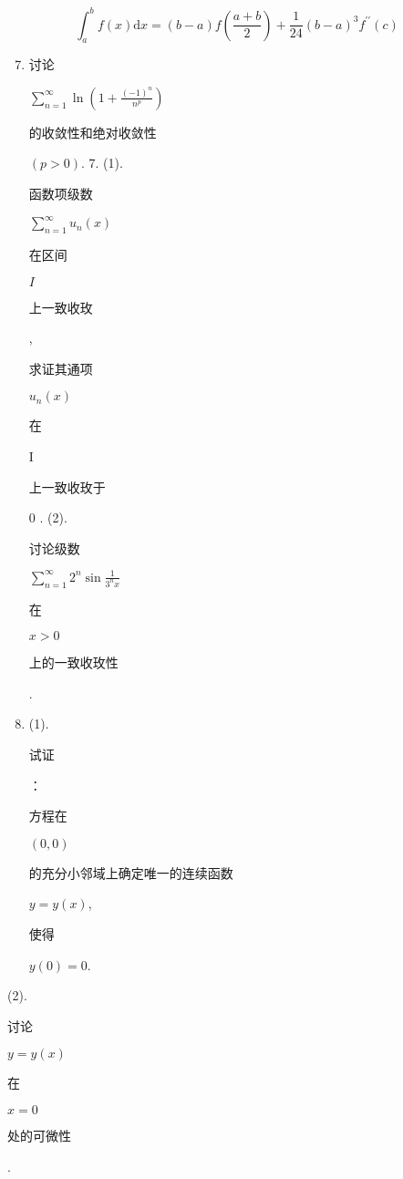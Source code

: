 \documentclass[10pt]{article}
\begin{document}
$$
\int_{a}^{b} f(x) \mathrm{d} x=(b-a) f\left(\frac{a+b}{2}\right)+\frac{1}{24}(b-a)^{3} f^{\prime \prime}(c)
$$

\begin{enumerate}
  \setcounter{enumi}{6}
  \item \begin{CJK}{UTF8}{mj}讨论\end{CJK} $\sum_{n=1}^{\infty} \ln \left(1+\frac{(-1)^{n}}{n^{p}}\right)$ \begin{CJK}{UTF8}{mj}的收敛性和绝对收敛性\end{CJK} $(p>0)$. 7. (1). \begin{CJK}{UTF8}{mj}函数项级数\end{CJK} $\sum_{n=1}^{\infty} u_{n}(x)$ \begin{CJK}{UTF8}{mj}在区间\end{CJK} $I$ \begin{CJK}{UTF8}{mj}上一致收玫\end{CJK}, \begin{CJK}{UTF8}{mj}求证其通项\end{CJK} $u_{n}(x)$ \begin{CJK}{UTF8}{mj}在\end{CJK} I \begin{CJK}{UTF8}{mj}上一致收玫于\end{CJK} 0 . (2). \begin{CJK}{UTF8}{mj}讨论级数\end{CJK} $\sum_{n=1}^{\infty} 2^{n} \sin \frac{1}{3^{n} x}$ \begin{CJK}{UTF8}{mj}在\end{CJK} $x>0$ \begin{CJK}{UTF8}{mj}上的一致收玫性\end{CJK}.

  \item (1). \begin{CJK}{UTF8}{mj}试证\end{CJK}：\begin{CJK}{UTF8}{mj}方程在\end{CJK} $(0,0)$ \begin{CJK}{UTF8}{mj}的充分小邻域上确定唯一的连续函数\end{CJK} $y=y(x)$, \begin{CJK}{UTF8}{mj}使得\end{CJK} $y(0)=0$.

\end{enumerate}
(2). \begin{CJK}{UTF8}{mj}讨论\end{CJK} $y=y(x)$ \begin{CJK}{UTF8}{mj}在\end{CJK} $x=0$ \begin{CJK}{UTF8}{mj}处的可微性\end{CJK}.
\end{document}
